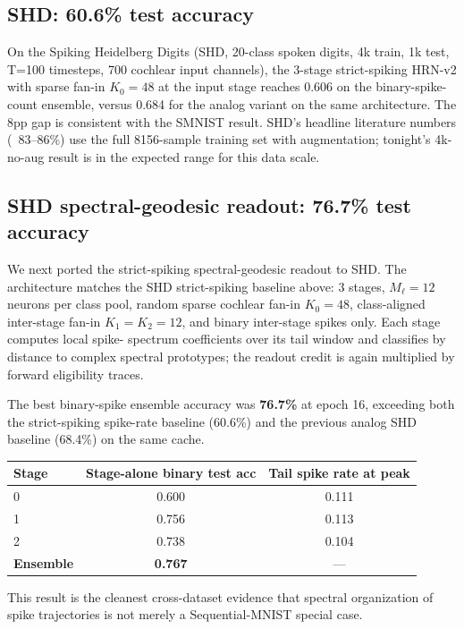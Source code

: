 \documentclass[11pt]{article}
\begin{document}
\subsection{SHD: 60.6\% test accuracy}

On the Spiking Heidelberg Digits (SHD, 20-class spoken digits, 4k
train, 1k test, T=100 timesteps, 700 cochlear input channels), the
3-stage strict-spiking HRN-v2 with sparse fan-in $K_0 = 48$ at the
input stage reaches 0.606 on the binary-spike-count ensemble,
versus 0.684 for the analog variant on the same architecture. The
8pp gap is consistent with the SMNIST result. SHD's headline
literature numbers (~83--86\%) use the full 8156-sample training
set with augmentation; tonight's 4k-no-aug result is in the
expected range for this data scale.

\subsection{SHD spectral-geodesic readout: 76.7\% test accuracy}

We next ported the strict-spiking spectral-geodesic readout to SHD.
The architecture matches the SHD strict-spiking baseline above:
3 stages, $M_\ell=12$ neurons per class pool, random sparse cochlear
fan-in $K_0=48$, class-aligned inter-stage fan-in $K_1=K_2=12$, and
binary inter-stage spikes only.  Each stage computes local spike-
spectrum coefficients over its tail window and classifies by distance
to complex spectral prototypes; the readout credit is again multiplied
by forward eligibility traces.

The best binary-spike ensemble accuracy was \textbf{76.7\%} at epoch
16, exceeding both the strict-spiking spike-rate baseline (60.6\%) and
the previous analog SHD baseline (68.4\%) on the same cache.

\begin{center}
\captionsetup{type=table}
\begin{tabular}{@{}lcc@{}}
\toprule
Stage & Stage-alone binary test acc & Tail spike rate at peak \\
\midrule
0 & 0.600 & 0.111 \\
1 & 0.756 & 0.113 \\
2 & 0.738 & 0.104 \\
\midrule
\textbf{Ensemble} & \textbf{0.767} & --- \\
\bottomrule
\end{tabular}
\end{center}

This result is the cleanest cross-dataset evidence that spectral
organization of spike trajectories is not merely a Sequential-MNIST
special case.
\end{document}

